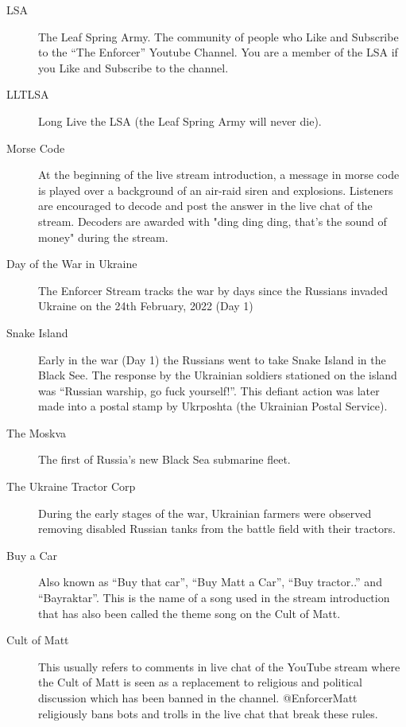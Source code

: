 \documentclass[11pt]{book}
\begin{document}
\begin{description}
\item[LSA] The Leaf Spring Army. The community of people who Like 
  and Subscribe to the ``The Enforcer'' Youtube Channel.
  You are a member of the LSA if you Like and Subscribe to the channel.

\item[LLTLSA] Long Live the LSA (the Leaf Spring Army will never die).

\item[Morse Code] At the beginning of the live stream introduction, a message in
  morse code is played over a background of an air-raid siren and explosions.
  Listeners are encouraged to decode and post the answer in the live chat of the
  stream. Decoders are awarded with "ding ding ding, that's the sound of money"
  during the stream.

\item [Day of the War in Ukraine] The Enforcer Stream tracks the war by days since the
  Russians invaded Ukraine on the 24th February, 2022 (Day 1)

\item [Snake Island] Early in the war (Day 1) the Russians went to take 
Snake Island in the Black See. The response by the Ukrainian soldiers stationed 
on the island was ``Russian warship, go fuck yourself!''. This defiant action 
was later made into a postal stamp by Ukrposhta (the Ukrainian Postal Service).
   
\item [The Moskva] The first of Russia's new Black Sea submarine fleet.

\item [The Ukraine Tractor Corp] During the early stages of the war, Ukrainian farmers 
  were observed removing disabled Russian tanks from the battle field with their tractors. 

\item [Buy a Car] Also known as ``Buy that car'', ``Buy Matt a Car'',  ``Buy tractor..'' and ``Bayraktar''. 
  This is the name of a song used in the stream introduction that has also been called the theme song
  on the Cult of Matt.

\item [Cult of Matt] This usually refers to comments in live chat of the YouTube stream 
  where the Cult of Matt is seen as a replacement
  to religious and political discussion which has been banned in the channel. @EnforcerMatt
  religiously bans bots and trolls in the live chat that break these rules.


\end{description}
\end{document}
